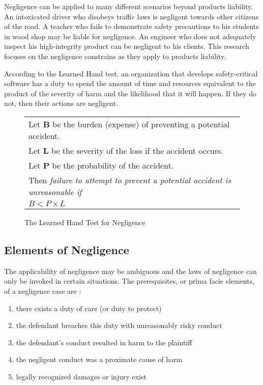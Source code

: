 Negligence can be applied to many different scenarios beyond products
liability. An intoxicated driver who disobeys traffic laws is negligent towards
other citizens of the road. A teacher who fails to demonstrate safety
precautions to his students in wood shop may be liable for negligence. An
engineer who does not adequately inspect his high-integrity product can be
negligent to his clients. This research focuses on the negligence constrains as
they apply to products liability.

According to the Learned Hand test, an organization that develops 
safety-critical software has a duty to spend the amount of time and resources
equivalent to the product of the severity of harm and the likelihood that it
will happen. If they do not, then their actions are negligent.

\begin{figure}
\begin{narrow}{-1.5in}{-1.5in}\begin{center}
\begin{tabular}{|l|}
\hline
	Let \textbf{B} be the burden (expense) of preventing a potential accident.\\
	Let \textbf{L} be the severity of the loss if the accident occurs.\\
	Let \textbf{P} be the probability of the accident.\\[6pt]
	Then \textit{failure to attempt to prevent a potential accident is 
	unreasonable if}\\[8pt]

      \centerline{\(B < P \times L\)}
\\[3pt]
\hline
\end{tabular}
\end{center}\end{narrow}
\caption{The Learned Hand Test for Negligence}
\label{fig:handtest}
\end{figure}

\subsection{Elements of Negligence}
The applicability of negligence may be ambiguous and the laws of negligence can
only be invoked in certain situations. The prerequisites, or prima facie
elements, of a negligence case are \cite{Dobbs01}:

\singlespace
\begin{enumerate}
 \item there exists a duty of care (or duty to protect)
 \item the defendant breaches this duty with unreasonably risky conduct
 \item the defendant's conduct resulted in harm to the plaintiff
 \item the negligent conduct was a proximate cause of harm
 \item legally recognized damages or injury exist
\end{enumerate}
\doublespace

